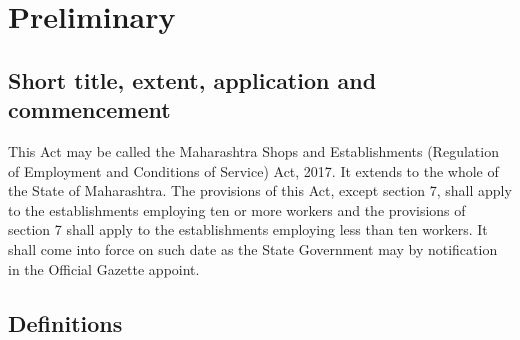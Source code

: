 \documentclass[gaz8,ordinance]{mhact}
\begin{document}
        \chapter{Preliminary} 
        
        \section{Short title, extent, application and commencement} 
        
      \begin{subsectionlist}
    
     This Act may be called the Maharashtra Shops and Establishments (Regulation of Employment and Conditions of Service) Act, 2017.
     It extends to the whole of the State of Maharashtra.
     The provisions of this Act, except section 7, shall apply to the 
establishments employing ten or more workers and the provisions of section 
7 shall apply to the establishments employing less than ten workers.
     It shall come into force on such date as the State Government may by 
notification in the Official Gazette appoint.
       \end{subsectionlist}
    
        \section{Definitions}
        
\end{document}
